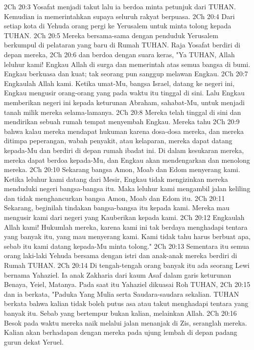 2Ch 20:3  Yosafat menjadi takut lalu ia berdoa minta petunjuk dari TUHAN. Kemudian ia memerintahkan supaya seluruh rakyat berpuasa.
2Ch 20:4  Dari setiap kota di Yehuda orang pergi ke Yerusalem untuk minta tolong kepada TUHAN.
2Ch 20:5  Mereka bersama-sama dengan penduduk Yerusalem berkumpul di pelataran yang baru di Rumah TUHAN. Raja Yosafat berdiri di depan mereka,
2Ch 20:6  dan berdoa dengan suara keras, "Ya TUHAN, Allah leluhur kami! Engkau Allah di surga dan memerintah atas semua bangsa di bumi. Engkau berkuasa dan kuat; tak seorang pun sanggup melawan Engkau.
2Ch 20:7  Engkaulah Allah kami. Ketika umat-Mu, bangsa Israel, datang ke negeri ini, Engkau mengusir orang-orang yang pada waktu itu tinggal di sini. Lalu Engkau memberikan negeri ini kepada keturunan Abraham, sahabat-Mu, untuk menjadi tanah milik mereka selama-lamanya.
2Ch 20:8  Mereka telah tinggal di sini dan mendirikan sebuah rumah tempat menyembah Engkau. Mereka tahu
2Ch 20:9  bahwa kalau mereka mendapat hukuman karena dosa-dosa mereka, dan mereka ditimpa peperangan, wabah penyakit, atau kelaparan, mereka dapat datang kepada-Mu dan berdiri di depan rumah ibadat ini. Di dalam kesukaran mereka, mereka dapat berdoa kepada-Mu, dan Engkau akan mendengarkan dan menolong mereka.
2Ch 20:10  Sekarang bangsa Amon, Moab dan Edom menyerang kami. Ketika leluhur kami datang dari Mesir, Engkau tidak mengizinkan mereka menduduki negeri bangsa-bangsa itu. Maka leluhur kami mengambil jalan keliling dan tidak menghancurkan bangsa Amon, Moab dan Edom itu.
2Ch 20:11  Sekarang, beginilah tindakan bangsa-bangsa itu kepada kami. Mereka mau mengusir kami dari negeri yang Kauberikan kepada kami.
2Ch 20:12  Engkaulah Allah kami! Hukumlah mereka, karena kami ini tak berdaya menghadapi tentara yang banyak itu, yang mau menyerang kami. Kami tidak tahu harus berbuat apa, sebab itu kami datang kepada-Mu minta tolong."
2Ch 20:13  Sementara itu semua orang laki-laki Yehuda bersama dengan istri dan anak-anak mereka berdiri di Rumah TUHAN.
2Ch 20:14  Di tengah-tengah orang banyak itu ada seorang Lewi bernama Yahaziel. Ia anak Zakharia dari kaum Asaf dalam garis keturunan Benaya, Yeiel, Matanya. Pada saat itu Yahaziel dikuasai Roh TUHAN,
2Ch 20:15  dan ia berkata, "Paduka Yang Mulia serta Saudara-saudara sekalian. TUHAN berkata bahwa kalian tidak boleh putus asa atau takut menghadapi tentara yang banyak itu. Sebab yang bertempur bukan kalian, melainkan Allah.
2Ch 20:16  Besok pada waktu mereka naik melalui jalan menanjak di Zis, seranglah mereka. Kalian akan berhadapan dengan mereka pada ujung lembah di depan padang gurun dekat Yeruel.
